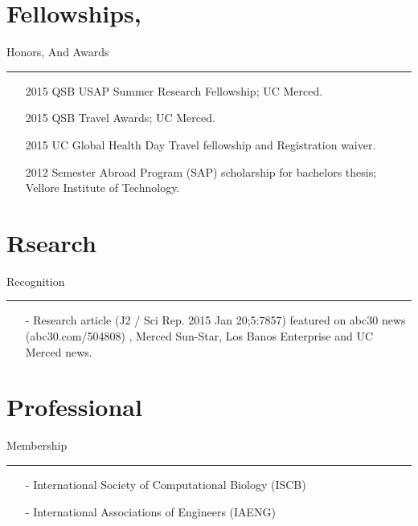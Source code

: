 \documentclass[line,margin]{cv_type2}
\begin{document}
\begin{resume}
\vskip 10pt
                 
\section{Fellowships,}\hskip 81pt {\large \sc Honors,} {\large \sc And }{\large \sc Awards}\hskip 4pt {\color {gray} \hfill \rule {9.8cm} {0.1pt}}
\begin{itemize}
\vskip 3pt
\end{itemize}
                \begin{itemize}
                \item[\color{gray} 2015] 
                 {QSB USAP Summer Research Fellowship}; UC Merced.
                \item[\color{gray} 2015]
                 {QSB Travel Awards}; UC Merced.
                \item[\color{gray} 2015]
                 {UC Global Health Day Travel fellowship and Registration waiver.}
                \item[\color{gray} 2012]
                 {Semester Abroad Program {\small(SAP)}} scholarship for bachelors thesis; Vellore Institute of Technology.
                \end{itemize}
\vskip 10pt

\section{Rsearch}\hskip 52pt {\large \sc Recognition} \hskip 4pt {\color {gray} \hfill \rule {11.4cm} {0.1pt}}
\begin{itemize}
\vskip 3pt
\end{itemize}
                \begin{itemize}
                \item[- ]
                Research article (J2 / Sci Rep. 2015 Jan 20;5:7857) featured on abc30 news (abc30.com/504808) , Merced Sun-Star, Los Banos Enterprise and UC Merced news.
                \end{itemize}

\vskip 10pt

\section{Professional}\hskip 83pt {\large \sc Membership} \hskip 4pt {\color {gray} \hfill \rule {11.4cm} {0.1pt}}
\begin{itemize}
\vskip 3pt
\end{itemize}
                \begin{itemize}
                    \item[- ]
                    {International Society of Computational Biology}{\small{ (ISCB)}}
                    \item[- ]
                    {International Associations of Engineers}{\small{ (IAENG)}}
                \end{itemize}
                
\end{resume}
\end{document}
